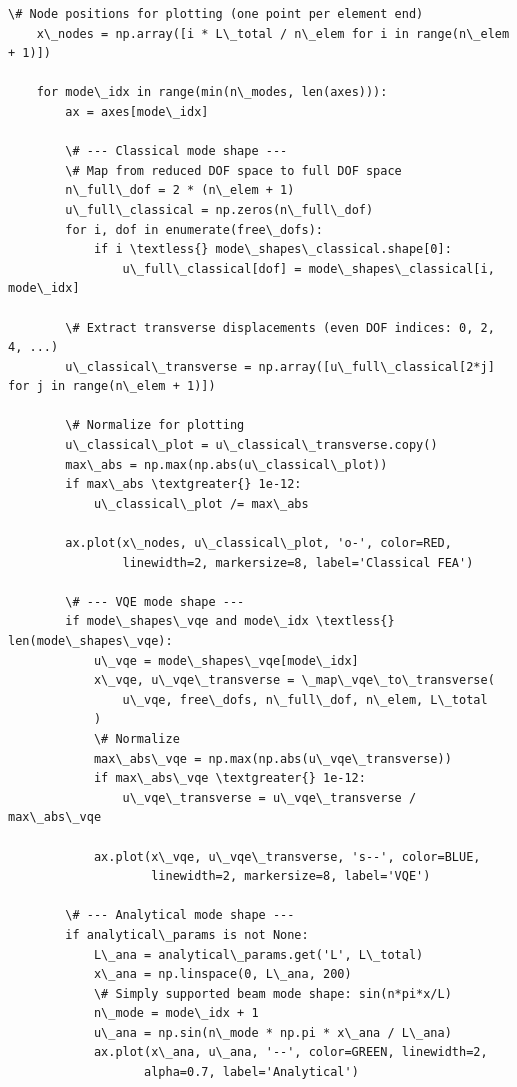 \documentclass[12pt, a4paper]{article}
\begin{document}
\begin{lstlisting}[style=codestyle, caption={{visualize.py --- Beam and Truss Visualizations}}]
    \# Node positions for plotting (one point per element end)
    x\_nodes = np.array([i * L\_total / n\_elem for i in range(n\_elem + 1)])

    for mode\_idx in range(min(n\_modes, len(axes))):
        ax = axes[mode\_idx]

        \# --- Classical mode shape ---
        \# Map from reduced DOF space to full DOF space
        n\_full\_dof = 2 * (n\_elem + 1)
        u\_full\_classical = np.zeros(n\_full\_dof)
        for i, dof in enumerate(free\_dofs):
            if i \textless{} mode\_shapes\_classical.shape[0]:
                u\_full\_classical[dof] = mode\_shapes\_classical[i, mode\_idx]

        \# Extract transverse displacements (even DOF indices: 0, 2, 4, ...)
        u\_classical\_transverse = np.array([u\_full\_classical[2*j] for j in range(n\_elem + 1)])

        \# Normalize for plotting
        u\_classical\_plot = u\_classical\_transverse.copy()
        max\_abs = np.max(np.abs(u\_classical\_plot))
        if max\_abs \textgreater{} 1e-12:
            u\_classical\_plot /= max\_abs

        ax.plot(x\_nodes, u\_classical\_plot, 'o-', color=RED,
                linewidth=2, markersize=8, label='Classical FEA')

        \# --- VQE mode shape ---
        if mode\_shapes\_vqe and mode\_idx \textless{} len(mode\_shapes\_vqe):
            u\_vqe = mode\_shapes\_vqe[mode\_idx]
            x\_vqe, u\_vqe\_transverse = \_map\_vqe\_to\_transverse(
                u\_vqe, free\_dofs, n\_full\_dof, n\_elem, L\_total
            )
            \# Normalize
            max\_abs\_vqe = np.max(np.abs(u\_vqe\_transverse))
            if max\_abs\_vqe \textgreater{} 1e-12:
                u\_vqe\_transverse = u\_vqe\_transverse / max\_abs\_vqe

            ax.plot(x\_vqe, u\_vqe\_transverse, 's--', color=BLUE,
                    linewidth=2, markersize=8, label='VQE')

        \# --- Analytical mode shape ---
        if analytical\_params is not None:
            L\_ana = analytical\_params.get('L', L\_total)
            x\_ana = np.linspace(0, L\_ana, 200)
            \# Simply supported beam mode shape: sin(n*pi*x/L)
            n\_mode = mode\_idx + 1
            u\_ana = np.sin(n\_mode * np.pi * x\_ana / L\_ana)
            ax.plot(x\_ana, u\_ana, '--', color=GREEN, linewidth=2,
                   alpha=0.7, label='Analytical')


\end{lstlisting}
\end{document}
